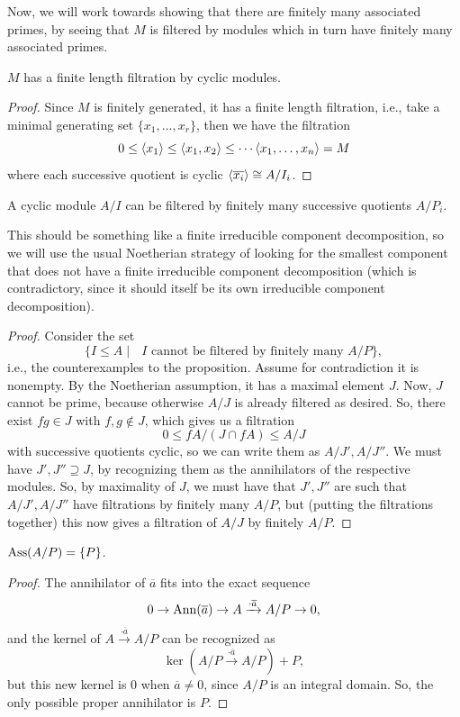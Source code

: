 \documentclass[12pt]{article}
\begin{document}
Now, we will work towards showing that there are finitely many associated primes, by seeing that $M$ is filtered by modules which in turn have finitely many associated primes.

\begin{prop}
    $M$ has a finite length filtration by cyclic modules.
\end{prop}
\begin{proof}
    Since $M$ is finitely generated, it has a finite length filtration, i.e., take a minimal generating set $\{x_1,\dots,x_r\}$, then we have the filtration
    \[0\leq \left\langle x_1\right\rangle \leq \left\langle x_1,x_2\right\rangle\leq \cdots \left\langle x_1,\dots,x_n\right\rangle=M\]
    where each successive quotient is cyclic $\left\langle\overline{x_i}\right\rangle\cong A/I_i$.
\end{proof}

\begin{prop}
    A cyclic module $A/I$ can be filtered by finitely many successive quotients $A/P_i$.
\end{prop}

This should be something like a finite irreducible component decomposition, so we will use the usual Noetherian strategy of looking for the smallest component that does not have a finite irreducible component decomposition (which is contradictory, since it should itself be its own irreducible component decomposition).

\begin{proof}
    Consider the set
    \[\{I\leq A \mid \text{ $I$ cannot be filtered by finitely many $A/P$}\},\]
    i.e., the counterexamples to the proposition. Assume for contradiction it is nonempty. By the Noetherian assumption, it has a maximal element $J$. Now, $J$ cannot be prime, because otherwise $A/J$ is already filtered as desired. So, there exist $fg\in J$ with $f,g \not\in J$, which gives us a filtration
    \[0 \leq fA/(J\cap fA) \leq A/J\]
    with successive quotients cyclic, so we can write them as $A/J',A/J''$. We must have $J',J''\supseteq J$, by recognizing them as the annihilators of the respective modules. So, by maximality of $J$, we must have that $J',J''$ are such that $A/J',A/J''$ have filtrations by finitely many $A/P$, but (putting the filtrations together) this now gives a filtration of $A/J$ by finitely $A/P$.
\end{proof}

\begin{prop}
    $\operatorname{Ass}(A/P)=\{P\}$.
\end{prop}
\begin{proof}
    The annihilator of $\overline{a}$ fits into the exact sequence
    \[0\to \mathrm{Ann}(\overline{a}) \to A \xrightarrow{\cdot \overline{a}} A/P \to 0,\]
    and the kernel of $A\xrightarrow{\cdot \overline{a}} A/P$ can be recognized as
    \[\ker(A/P \xrightarrow{\cdot \overline{a}} A/P) + P,\]
    but this new kernel is 0 when $\overline{a}\neq 0$, since $A/P$ is an integral domain. So, the only possible proper annihilator is $P$.
\end{proof}
\end{document}
